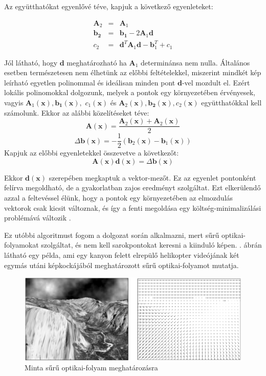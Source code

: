 Az együtthatókat egyenlővé téve, kapjuk a következő egyenleteket:

\[\begin{array}{rcl}\mathbf{A}_2 &=& \mathbf{A}_1\\\mathbf{b_2} &=& \mathbf{b_1} - 2 \mathbf{A}_1\mathbf{d}\\ c_2 &=& \mathbf{d}^T \mathbf{A}_1 \mathbf{d} -\mathbf{b}_1^T + c_1 \end{array}\]

Jól látható, hogy $\mathbf{d}$ meghatározható ha $\mathbf{A}_1$ determinánsa nem nulla. Általános esetben természetesen nem élhetünk az előbbi feltételekkel, miszerint mindkét kép leírható egyetlen polinommal és ideálisan minden pont $\mathbf{d}$-vel mozdult el. Ezért lokális polinomokkal dolgozunk, melyek a pontok egy környezetében érvényesek, vagyis $\mathbf{A}_1(\mathbf{x}), \mathbf{b_1}(\mathbf{x}),$ $c_1(\mathbf{x})$ és $\mathbf{A}_2(\mathbf{x}), \mathbf{b_2}(\mathbf{x}), c_2(\mathbf{x})$ együtthatókkal kell számolunk. Ekkor az alábbi közelítéseket téve:
\[\mathbf{A}(\mathbf{x}) = \frac{\mathbf{A}_2(\mathbf{x}) + \mathbf{A}_2(\mathbf{x})}{2}\]
\[\Delta \mathbf{b}(\mathbf{x}) = -\frac{1}{2}\left(\mathbf{b}_2(\mathbf{x})-\mathbf{b}_1(\mathbf{x})\right)\]
Kapjuk az előbbi egyenletekkel összevetve a következőt:
\[\mathbf{A}(\mathbf{x})\mathbf{d}(\mathbf{x}) = \Delta \mathbf{b}(\mathbf{x})\]

Ekkor $\mathbf{d}(\mathbf{x})$ szerepében megkaptuk a vektor-mezőt. Ez az egyenlet pontonként felírva megoldható, de a gyakorlatban zajos eredményt szolgáltat. Ezt elkerülendő azzal a feltevéssel élünk, hogy a pontok egy környezetében az elmozdulás vektorok csak kicsit változnak, és így a fenti megoldása egy költség-minimalizálási problémává változik \cite{farneback}.

Ez utóbbi algoritmust \cite{opencv-lk} fogom a dolgozat során alkalmazni, mert sűrű optikai-folyamokat szolgáltat, és nem kell sarokpontokat keresni a kiinduló képen. . ábrán látható egy példa, ami egy kanyon felett elrepülő helikopter videójának két egymás utáni képkockájából meghatározott sűrű optikai-folyamot mutatja.

\begin{figure}[tbh]
\centering
\includegraphics[width=420pt]{figures/farneback.png}
\caption{Minta sűrű optikai-folyam meghatározásra \cite{farneback} \label{fig:dense-of}}
\end{figure}

